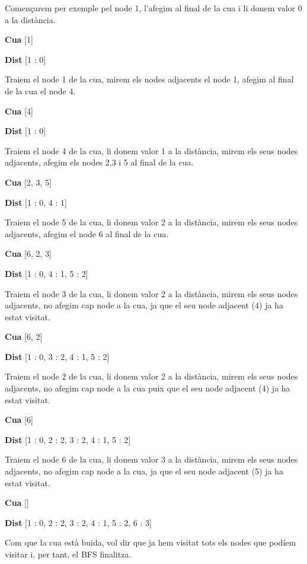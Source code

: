 Començarem per exemple pel node 1, l’afegim al final de la cua i li donem valor 0 a la distància. \newline

\textbf{Cua} [1]

\textbf{Dist} [1 : 0] \newline

Traiem el node 1 de la cua, mirem els nodes adjacents el node 1, afegim al final de la cua el node 4. \newline

\textbf{Cua} [4]

\textbf{Dist} [1 : 0] \newline

Traiem el node 4 de la cua, li donem valor 1 a la distància, mirem els seus nodes adjacents, afegim els nodes 2,3 i 5 al final de la cua. \newline

\textbf{Cua} [2, 3, 5]

\textbf{Dist} [1 : 0, 4 : 1] \newline

Traiem el node 5 de la cua, li donem valor 2 a la distància, mirem els seus nodes adjacents, afegim el node 6 al final de la cua. \newline

\textbf{Cua} [6, 2, 3]

\textbf{Dist} [1 : 0, 4 : 1, 5 : 2] \newline

Traiem el node 3 de la cua, li donem valor 2 a la distància, mirem els seus nodes adjacents, no afegim cap node a la cua, ja que el seu node adjacent (4) ja ha estat visitat. \newline

\textbf{Cua} [6, 2]

\textbf{Dist} [1 : 0, 3 : 2, 4 : 1, 5 : 2] \newline

Traiem el node 2 de la cua, li donem valor 2 a la distància, mirem els seus nodes adjacents, no afegim cap node a la cua puix que el seu node adjacent (4) ja ha estat visitat. \newline

\textbf{Cua} [6]

\textbf{Dist} [1 : 0, 2 : 2, 3 : 2, 4 : 1, 5 : 2] \newline

Traiem el node 6 de la cua, li donem valor 3 a la distància, mirem els seus nodes adjacents, no afegim cap node a la cua, ja que el seu node adjacent (5) ja ha estat visitat. \newline

\textbf{Cua} []

\textbf{Dist} [1 : 0, 2 : 2, 3 : 2, 4 : 1, 5 : 2, 6 : 3] \newline

Com que la cua està buida, vol dir que ja hem visitat tots els nodes que podíem visitar i, per tant, el BFS finalitza.



